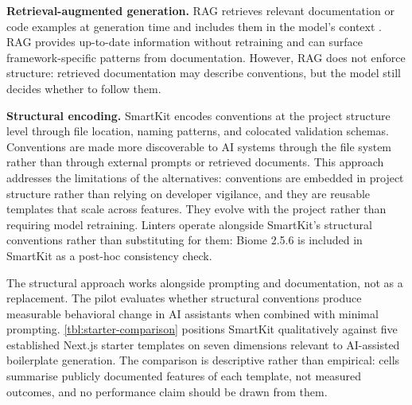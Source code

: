 \documentclass[12pt,a4paper]{report}
\begin{document}
\textbf{Retrieval-augmented generation.} RAG retrieves relevant documentation or code examples at generation time and includes them in the model's context \parencite{lewis2020retrieval,ram2023context}. RAG provides up-to-date information without retraining and can surface framework-specific patterns from documentation. However, RAG does not enforce structure: retrieved documentation may describe conventions, but the model still decides whether to follow them.

\textbf{Structural encoding.} SmartKit encodes conventions at the project structure level through file location, naming patterns, and colocated validation schemas. Conventions are made more discoverable to AI systems through the file system rather than through external prompts or retrieved documents. This approach addresses the limitations of the alternatives: conventions are embedded in project structure rather than relying on developer vigilance, and they are reusable templates that scale across features. They evolve with the project rather than requiring model retraining. Linters operate alongside SmartKit's structural conventions rather than substituting for them: Biome 2.5.6 is included in SmartKit as a post-hoc consistency check.

The structural approach works alongside prompting and documentation, not as a replacement. The pilot evaluates whether structural conventions produce measurable behavioral change in AI assistants when combined with minimal prompting. \autoref{tbl:starter-comparison} positions SmartKit qualitatively against five established Next.js starter templates on seven dimensions relevant to AI-assisted boilerplate generation. The comparison is descriptive rather than empirical: cells summarise publicly documented features of each template, not measured outcomes, and no performance claim should be drawn from them.
\end{document}
